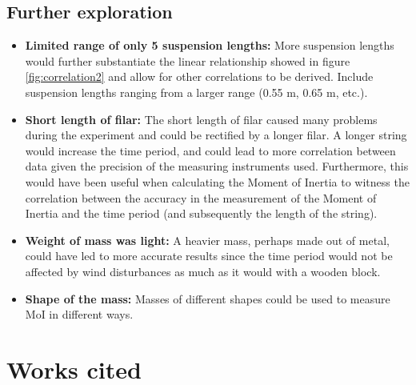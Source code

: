 \documentclass[a4paper,12pt]{article}
\theoremstyle{definition}
\begin{document}
\subsection{Further exploration}
\begin{itemize}
	\item \textbf{Limited range of only 5 suspension lengths:} More suspension lengths would further substantiate the linear relationship showed in figure \ref{fig:correlation2} and allow for other correlations to be derived.     Include suspension lengths ranging from a larger range (0.55 m, 0.65 m, etc.).
	\item \textbf{Short length of filar:} The short length of filar caused many problems during the experiment and could be rectified by a longer filar. A longer string would increase the time period, and could lead to more correlation between data given the precision of the measuring instruments used. Furthermore, this would have been useful when calculating the Moment of Inertia to witness the correlation between the accuracy in the measurement of the Moment of Inertia and the time period (and subsequently the length of the string). 
	\item \textbf{Weight of mass was light:} A heavier mass, perhaps made out of metal, could have led to more accurate results since the time period would not be affected by wind disturbances as much as it would with a wooden block.
	\item \textbf{Shape of the mass: }Masses of different shapes could be used to measure MoI in different ways.
\end{itemize}



\section{Works cited}
\end{document}
